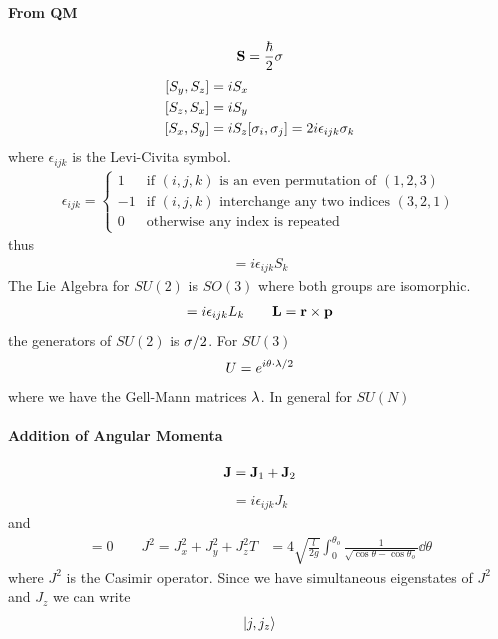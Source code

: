 \documentclass[../main.tex]{subfiles}
\begin{document}
\paragraph{From QM}
\begin{align*}
    \vb{S} = \frac{\hbar}{2} \vb{\sigma}
\end{align*}
\begin{align*}
    \qt[S_y, S_z] &= i S_x \\
    \qt[S_z, S_x] &= i S_y \\
    \qt[S_x, S_y] &= i S_z
    \qt[\sigma_i, \sigma_j] = 2i \epsilon_{ijk} \sigma_k
\end{align*}
where $\epsilon_{ijk}$ is the Levi-Civita symbol.
\begin{align*}
    \epsilon_{ijk} = \begin{cases}
        1 & \textrm{if } (i, j, k) \textrm{ is an even permutation of } (1, 2, 3) \\
        -1 & \textrm{if } (i, j, k) \textrm{ interchange any two indices } (3, 2, 1) \\
        0 & \textrm{otherwise any index is repeated}
    \end{cases}
\end{align*}
thus
\begin{align*}
    [S_i, S_j] = i \epsilon_{ijk} S_k
\end{align*}
The Lie Algebra for $SU(2)$ is $SO(3)$ where both groups are isomorphic.
\begin{align*}
    [L_i, L_j] = i \epsilon_{ijk} L_k \qquad \vb{L} = \vb{r} \times \vb{p}
\end{align*}
the generators of $SU(2)$ is $\vb{\sigma}/2$. For $SU(3)$
\begin{align*}
    U = e^{i \vb\theta \cdot \vb\lambda/2}
\end{align*}
where we have the Gell-Mann matrices $\vb\lambda$. In general for $SU(N)$

\paragraph{Addition of Angular Momenta}
\begin{align*}
    \vb{J} = \vb{J}_1 + \vb{J}_2
\end{align*}
\begin{align*}
    [J_i, J_j] = i \epsilon_{ijk} J_k
\end{align*}
and
\begin{align*}
    [J^2, J_i] = 0 \qquad J^2 = J_x^2 + J_y^2 + J_z^2T &= 4\sqrt{\frac{l}{2g}}
    \int_0^{\theta_o} \frac{1}{\sqrt{\cos\theta - \cos\theta_o}} \dd{\theta}
\end{align*}
where $J^2$ is the Casimir operator. Since we have simultaneous eigenstates of $J^2$ and $J_z$ we
can write
\begin{align*}
    \ket{j,j_z}
\end{align*}
\end{document}
